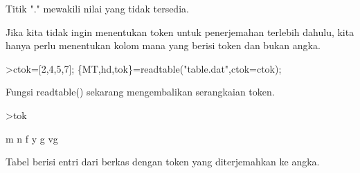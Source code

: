 \documentclass[a4paper,10pt]{article}
\begin{document}
\begin{eulernotebook}
\begin{eulercomment}
\begin{eulercomment}
\begin{eulercomment}
\begin{eulercomment}
\begin{eulercomment}
\begin{eulercomment}
\begin{eulercomment}
\begin{eulercomment}
\begin{eulercomment}
\begin{eulercomment}
\begin{eulercomment}
\begin{eulercomment}
\begin{eulercomment}
\begin{eulercomment}
\begin{eulercomment}
\begin{eulercomment}
\begin{eulercomment}
\begin{eulercomment}
\begin{eulercomment}
\begin{eulercomment}
\begin{eulercomment}
\begin{eulercomment}
\begin{eulercomment}
\begin{eulercomment}
\begin{eulercomment}
\begin{eulercomment}
\begin{eulercomment}
\begin{eulercomment}
\begin{eulercomment}
\begin{eulercomment}
\begin{eulercomment}
\begin{eulercomment}
\begin{eulercomment}
Titik "." mewakili nilai yang tidak tersedia.

Jika kita tidak ingin menentukan token untuk penerjemahan terlebih
dahulu, kita hanya perlu menentukan kolom mana yang berisi token dan
bukan angka.
\end{eulercomment}
\begin{eulerprompt}
>ctok=[2,4,5,7]; \{MT,hd,tok\}=readtable("table.dat",ctok=ctok);
\end{eulerprompt}
\begin{eulercomment}
Fungsi readtable() sekarang mengembalikan serangkaian token.
\end{eulercomment}
\begin{eulerprompt}
>tok
\end{eulerprompt}
\begin{euleroutput}
  m
  n
  f
  y
  g
  vg
\end{euleroutput}
\begin{eulercomment}
Tabel berisi entri dari berkas dengan token yang diterjemahkan ke
angka.


\end{eulercomment}
\end{eulercomment}
\end{eulercomment}
\end{eulercomment}
\end{eulercomment}
\end{eulercomment}
\end{eulercomment}
\end{eulercomment}
\end{eulercomment}
\end{eulercomment}
\end{eulercomment}
\end{eulercomment}
\end{eulercomment}
\end{eulercomment}
\end{eulercomment}
\end{eulercomment}
\end{eulercomment}
\end{eulercomment}
\end{eulercomment}
\end{eulercomment}
\end{eulercomment}
\end{eulercomment}
\end{eulercomment}
\end{eulercomment}
\end{eulercomment}
\end{eulercomment}
\end{eulercomment}
\end{eulercomment}
\end{eulercomment}
\end{eulercomment}
\end{eulercomment}
\end{eulercomment}
\end{eulercomment}
\end{eulernotebook}
\end{document}
